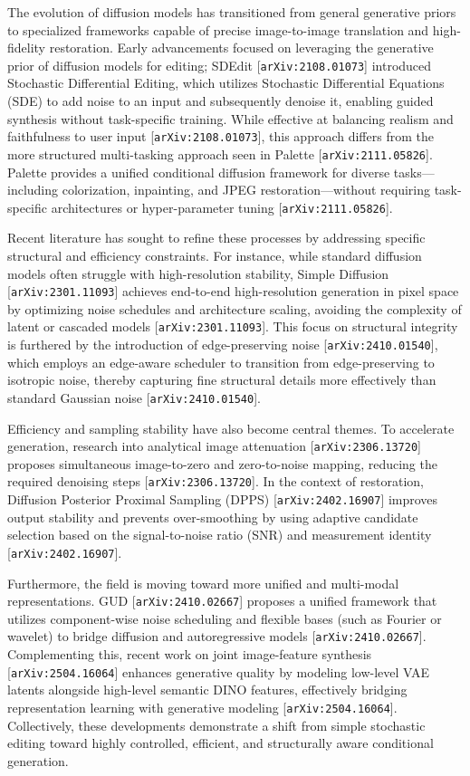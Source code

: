 \documentclass[11pt]{article}
\begin{document}
The evolution of diffusion models has transitioned from general generative priors to specialized frameworks capable of precise image-to-image translation and high-fidelity restoration. Early advancements focused on leveraging the generative prior of diffusion models for editing; SDEdit [\texttt{arXiv:2108.01073}] introduced Stochastic Differential Editing, which utilizes Stochastic Differential Equations (SDE) to add noise to an input and subsequently denoise it, enabling guided synthesis without task-specific training. While effective at balancing realism and faithfulness to user input [\texttt{arXiv:2108.01073}], this approach differs from the more structured multi-tasking approach seen in Palette [\texttt{arXiv:2111.05826}]. Palette provides a unified conditional diffusion framework for diverse tasks—including colorization, inpainting, and JPEG restoration—without requiring task-specific architectures or hyper-parameter tuning [\texttt{arXiv:2111.05826}].

Recent literature has sought to refine these processes by addressing specific structural and efficiency constraints. For instance, while standard diffusion models often struggle with high-resolution stability, Simple Diffusion [\texttt{arXiv:2301.11093}] achieves end-to-end high-resolution generation in pixel space by optimizing noise schedules and architecture scaling, avoiding the complexity of latent or cascaded models [\texttt{arXiv:2301.11093}]. This focus on structural integrity is furthered by the introduction of edge-preserving noise [\texttt{arXiv:2410.01540}], which employs an edge-aware scheduler to transition from edge-preserving to isotropic noise, thereby capturing fine structural details more effectively than standard Gaussian noise [\texttt{arXiv:2410.01540}].

Efficiency and sampling stability have also become central themes. To accelerate generation, research into analytical image attenuation [\texttt{arXiv:2306.13720}] proposes simultaneous image-to-zero and zero-to-noise mapping, reducing the required denoising steps [\texttt{arXiv:2306.13720}]. In the context of restoration, Diffusion Posterior Proximal Sampling (DPPS) [\texttt{arXiv:2402.16907}] improves output stability and prevents over-smoothing by using adaptive candidate selection based on the signal-to-noise ratio (SNR) and measurement identity [\texttt{arXiv:2402.16907}].

Furthermore, the field is moving toward more unified and multi-modal representations. GUD [\texttt{arXiv:2410.02667}] proposes a unified framework that utilizes component-wise noise scheduling and flexible bases (such as Fourier or wavelet) to bridge diffusion and autoregressive models [\texttt{arXiv:2410.02667}]. Complementing this, recent work on joint image-feature synthesis [\texttt{arXiv:2504.16064}] enhances generative quality by modeling low-level VAE latents alongside high-level semantic DINO features, effectively bridging representation learning with generative modeling [\texttt{arXiv:2504.16064}]. Collectively, these developments demonstrate a shift from simple stochastic editing toward highly controlled, efficient, and structurally aware conditional generation.
\end{document}
